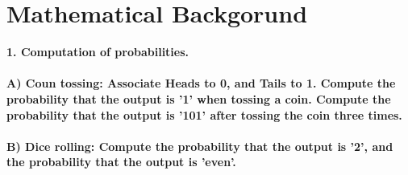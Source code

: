 \documentclass[]{article}
\numberwithin{figure}{section}
\begin{document}
\newpage

\section{Mathematical Backgorund}

\textbf{1. Computation of probabilities. \\ \\
	\indent A) Coun tossing: Associate Heads to 0, and Tails to 1. Compute the probability that the output is '1' when tossing a coin. Compute the probability that the output is '101' after tossing the coin three times. \\ \\
	\indent B) Dice rolling: Compute the probability that the output is '2', and the probability that the output is 'even'.}
	
\end{document}
